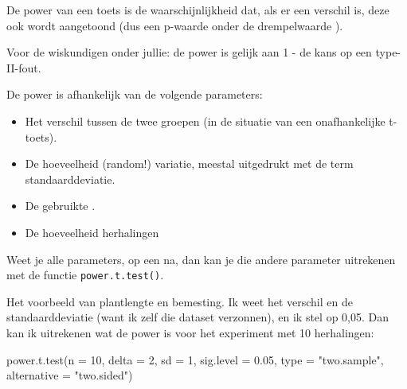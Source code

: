 \documentclass[
  letterpaper,
  DIV=11,
  numbers=noendperiod]{scrreprt}
\newenvironment{Shaded}{\begin{snugshade}}{\end{snugshade}}
\newcommand{\AttributeTok}[1]{\textcolor[rgb]{0.40,0.45,0.13}{#1}}
\newcommand{\DecValTok}[1]{\textcolor[rgb]{0.68,0.00,0.00}{#1}}
\newcommand{\FloatTok}[1]{\textcolor[rgb]{0.68,0.00,0.00}{#1}}
\newcommand{\FunctionTok}[1]{\textcolor[rgb]{0.28,0.35,0.67}{#1}}
\newcommand{\NormalTok}[1]{\textcolor[rgb]{0.00,0.23,0.31}{#1}}
\newcommand{\StringTok}[1]{\textcolor[rgb]{0.13,0.47,0.30}{#1}}
\providecommand{\tightlist}{%
  \setlength{\itemsep}{0pt}\setlength{\parskip}{0pt}}\usepackage{longtable,booktabs,array}
\theoremstyle{definition}
\theoremstyle{remark}
\begin{document}
De power van een toets is de waarschijnlijkheid dat, als er een verschil
is, deze ook wordt aangetoond (dus een p-waarde onder de drempelwaarde
\alpha).

\begin{tcolorbox}[enhanced jigsaw, colbacktitle=quarto-callout-note-color!10!white, colframe=quarto-callout-note-color-frame, leftrule=.75mm, title=\textcolor{quarto-callout-note-color}{\faInfo}\hspace{0.5em}{Note}, coltitle=black, toprule=.15mm, colback=white, breakable, opacityback=0, bottomrule=.15mm, arc=.35mm, opacitybacktitle=0.6, bottomtitle=1mm, toptitle=1mm, rightrule=.15mm, titlerule=0mm, left=2mm]
Voor de wiskundigen onder jullie: de power is gelijk aan 1 - de kans op
een type-II-fout.
\end{tcolorbox}

De power is afhankelijk van de volgende parameters:

\begin{itemize}
\tightlist
\item
  Het verschil tussen de twee groepen (in de situatie van een
  onafhankelijke t-toets).
\item
  De hoeveelheid (random!) variatie, meestal uitgedrukt met de term
  standaarddeviatie.
\item
  De gebruikte \alpha.
\item
  De hoeveelheid herhalingen
\end{itemize}

Weet je alle parameters, op een na, dan kan je die andere parameter
uitrekenen met de functie \texttt{power.t.test()}.

Het voorbeeld van plantlengte en bemesting. Ik weet het verschil en de
standaarddeviatie (want ik zelf die dataset verzonnen), en ik stel
\alpha op 0,05. Dan kan ik uitrekenen wat de power is voor het
experiment met 10 herhalingen:

\begin{Shaded}
\begin{Highlighting}[]
\FunctionTok{power.t.test}\NormalTok{(}\AttributeTok{n =} \DecValTok{10}\NormalTok{, }\AttributeTok{delta =} \DecValTok{2}\NormalTok{, }\AttributeTok{sd =} \DecValTok{1}\NormalTok{, }\AttributeTok{sig.level =} \FloatTok{0.05}\NormalTok{, }\AttributeTok{type =} \StringTok{"two.sample"}\NormalTok{, }\AttributeTok{alternative =} \StringTok{"two.sided"}\NormalTok{)}
\end{Highlighting}
\end{Shaded}
\end{document}

